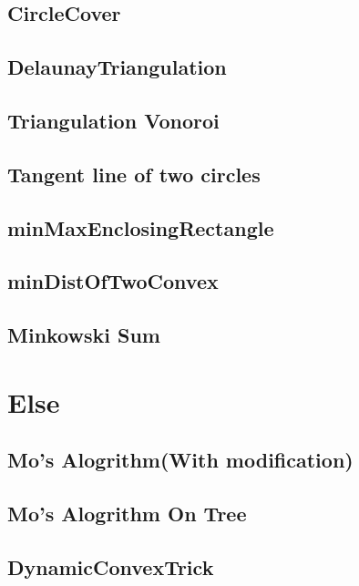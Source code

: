 \subsection{CircleCover}

\subsection{DelaunayTriangulation}

\subsection{Triangulation Vonoroi}

\subsection{Tangent line of two circles}

\subsection{minMaxEnclosingRectangle}

\subsection{minDistOfTwoConvex}

\subsection{Minkowski Sum}



\section{Else}
\subsection{Mo's Alogrithm(With modification)}

\subsection{Mo's Alogrithm On Tree}

\subsection{DynamicConvexTrick}


